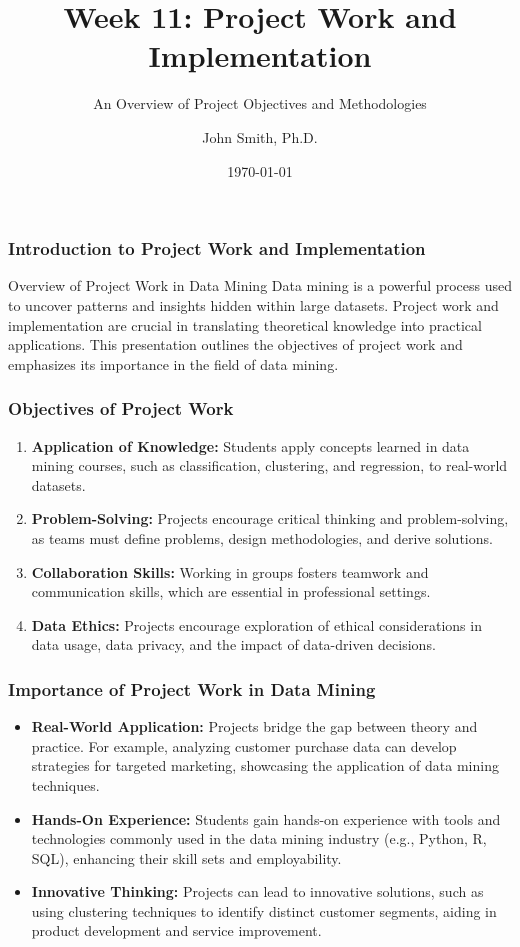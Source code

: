 \documentclass[aspectratio=169]{beamer}
\title[Academic Template]{Week 11: Project Work and Implementation}
\subtitle{An Overview of Project Objectives and Methodologies}
\author[J. Smith]{John Smith, Ph.D.}
\institute[University Name]{
  Department of Computer Science\\
  University Name\\
  \vspace{0.3cm}
  Email: email@university.edu\\
  Website: www.university.edu
}
\date{\today}
\begin{document}
\frame{\titlepage}

\begin{frame}[fragile]
    \frametitle{Introduction to Project Work and Implementation}
    \begin{block}{Overview of Project Work in Data Mining}
        Data mining is a powerful process used to uncover patterns and insights hidden within large datasets. Project work and implementation are crucial in translating theoretical knowledge into practical applications. This presentation outlines the objectives of project work and emphasizes its importance in the field of data mining.
    \end{block}
\end{frame}

\begin{frame}[fragile]
    \frametitle{Objectives of Project Work}
    \begin{enumerate}
        \item \textbf{Application of Knowledge:} 
            Students apply concepts learned in data mining courses, such as classification, clustering, and regression, to real-world datasets.
        \item \textbf{Problem-Solving:} 
            Projects encourage critical thinking and problem-solving, as teams must define problems, design methodologies, and derive solutions.
        \item \textbf{Collaboration Skills:} 
            Working in groups fosters teamwork and communication skills, which are essential in professional settings.
        \item \textbf{Data Ethics:} 
            Projects encourage exploration of ethical considerations in data usage, data privacy, and the impact of data-driven decisions.
    \end{enumerate}
\end{frame}

\begin{frame}[fragile]
    \frametitle{Importance of Project Work in Data Mining}
    \begin{itemize}
        \item \textbf{Real-World Application:} 
            Projects bridge the gap between theory and practice. For example, analyzing customer purchase data can develop strategies for targeted marketing, showcasing the application of data mining techniques.
        \item \textbf{Hands-On Experience:} 
            Students gain hands-on experience with tools and technologies commonly used in the data mining industry (e.g., Python, R, SQL), enhancing their skill sets and employability.
        \item \textbf{Innovative Thinking:} 
            Projects can lead to innovative solutions, such as using clustering techniques to identify distinct customer segments, aiding in product development and service improvement.
    \end{itemize}
\end{frame}
\end{document}
